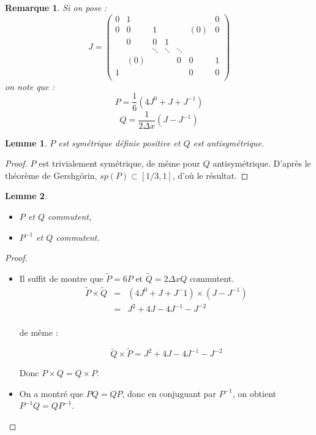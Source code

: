 \documentclass[10pt,a4paper]{article}
\newtheorem{lemme}{Lemme}
\newtheorem{remarque}{Remarque}
\begin{document}
\begin{remarque}
Si on pose :
$$J=
\begin{pmatrix}
0 & 1 &   &   &   &   & 0 \\
0 & 0 & 1 &   &   &(0)& 0 \\
  & 0 & 0 & 1 &   &   &   \\
  &   & \ddots & \ddots & \ddots &  & \\
  &(0)&   &   & 0 & 0 & 1 \\
1 &   &   &   &   & 0 & 0 \\
\end{pmatrix}
$$
on note que :
\begin{equation}
P=\dfrac{1}{6}\left( 4 J^0 + J + J^{-1} \right)
\end{equation}
\begin{equation}
Q=\dfrac{1}{2 \Delta x} \left( J - J^{-1} \right)
\end{equation}
\end{remarque}

\begin{lemme}
$P$ est symétrique définie positive et $Q$ est antisymétrique.
\label{lem:symetriePQ}
\end{lemme}

\begin{proof}
$P$ est trivialement symétrique, de même pour $Q$ antisymétrique.
D'après le théorème de Gershgörin, $sp(P) \subset \left[ 1/3, 1 \right]$, d'où le résultat.
\end{proof}

\begin{lemme}

\begin{itemize}
\item $P$ et $Q$ commutent,
\item $P^{-1}$ et $Q$ commutent.
\end{itemize}
\label{lem:commutation}
\end{lemme}

\begin{proof}
\begin{itemize}
\item Il suffit de montre que $\tilde{P} = 6 P$ et $\tilde{Q}=2 \Delta x Q$ commutent.
$$
\begin{array}{rcl}
\tilde{P} \times \tilde{Q} & = & \left( 4 J^0 + J + J^-1 \right) \times \left(  J - J^{-1} \right) \\
                           & = & J^2 + 4 J - 4 J^{-1} - J^{-2}\\
\end{array}
$$

de même :

$$\tilde{Q} \times \tilde{P} = J^2 + 4 J - 4 J^{-1} - J^{-2}$$

Donc $P \times Q = Q \times P$.

\item On a montré que $PQ=QP$, donc en conjuguant par $P^{-1}$, on obtient $P^{-1}Q=QP^{-1}$.
\end{itemize}
\end{proof}
\end{document}
